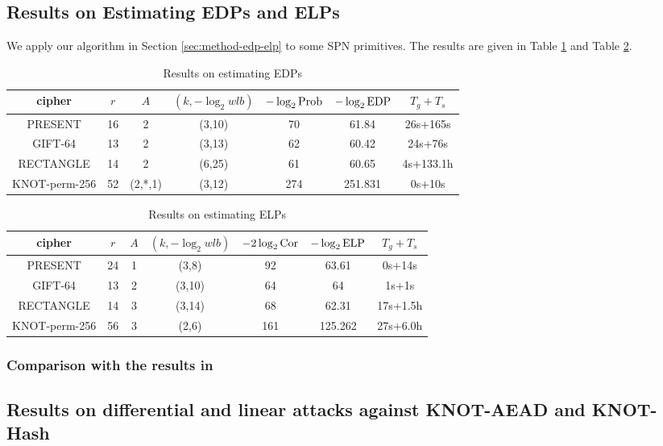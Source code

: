 \subsection{Results on Estimating EDPs and ELPs}

We apply our algorithm in Section \ref{sec:method-edp-elp} to some SPN primitives. The results are given in Table \ref{tab:EDP} and Table \ref{tab:ELP}. 

\begin{table}
	\caption{Results on estimating EDPs}\label{tab:EDP}
	\centering
	\begin{tabular}{|c|c|c|c|c|c|c|}
		\hline
		cipher & $r$ & $A$ & $(k,-\log_2wlb)$ & $-\log_2\text{Prob}$ & $-\log_2\text{EDP}$ & $T_g+T_s$ \\
		\hline
		PRESENT & 16 & 2 & (3,10) & 70 & 61.84 & 26s+165s\\
		\hline
		GIFT-64 & 13 & 2 & (3,13) & 62 & 60.42 & 24s+76s\\
		\hline 
		RECTANGLE & 14 & 2 & (6,25) & 61 & 60.65 & 4s+133.1h \\
		\hline
		KNOT-perm-256 & 52 & (2,*,1) & (3,12) & 274 & 251.831 & 0s+10s\\
		\hline
	\end{tabular}
\end{table}

\begin{table}
	\caption{Results on estimating ELPs}\label{tab:ELP}
	\centering
	\begin{tabular}{|c|c|c|c|c|c|c|}
		\hline
		cipher & $r$ & $A$ & $(k,-\log_2wlb)$ & $-2\log_2\text{Cor}$ & $-\log_2\text{ELP}$ & $T_g+T_s$ \\
		\hline
		PRESENT & 24 & 1 & (3,8) & 92 & 63.61 & 0s+14s\\
		\hline
		GIFT-64 & 13 & 2 & (3,10) & 64 & 64 & 1s+1s\\
		\hline 
		RECTANGLE & 14 & 3 & (3,14) & 68 & 62.31 & 17s+1.5h \\
		\hline
		KNOT-perm-256 & 56 & 3 & (2,6) & 161 & 125.262 & 27s+6.0h\\
		\hline
	\end{tabular}
\end{table}

\subsubsection{Comparison with the results in \cite{EPRINT:HalVej18}}



\subsection{Results on differential and linear attacks against KNOT-AEAD and KNOT-Hash}

